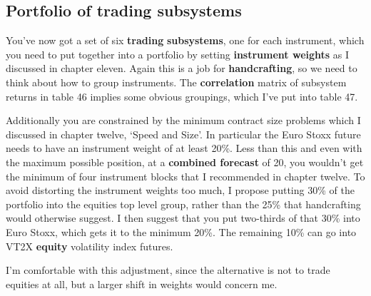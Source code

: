 \subsection*{Portfolio of trading subsystems}

You've now got a set of six \textbf{trading} \textbf{subsystems}, one for each instrument, which you need to put together into a portfolio by setting \textbf{instrument weights} as I discussed in chapter eleven. Again this is a job for \textbf{handcrafting}, so we need to think about how to group instruments. The \textbf{correlation} matrix of subsystem returns in table 46 implies some obvious groupings, which I've put into table 47.

Additionally you are constrained by the minimum contract size problems which I discussed in chapter twelve, ‘Speed and Size'. In particular the Euro Stoxx future needs to have an instrument weight of at least 20\%. Less than this and even with the maximum possible position, at a \textbf{combined forecast} of 20, you wouldn't get the minimum of four instrument blocks that I recommended in chapter twelve.
To avoid distorting the instrument weights too much, I propose putting 30\% of the portfolio into the equities top level group, rather than the 25\% that handcrafting would otherwise suggest. I then suggest that you put two-thirds of that 30\% into Euro Stoxx, which gets it to the minimum 20\%. The remaining 10\% can go into VT2X \textbf{equity} volatility index futures.

I'm comfortable with this adjustment, since the alternative is not to trade equities at all, but a larger shift in weights would concern me.

 \begingroup \scriptsize \setlength{\tabcolsep}{3pt} \renewcommand{\arraystretch}{1.08}
\endgroup

